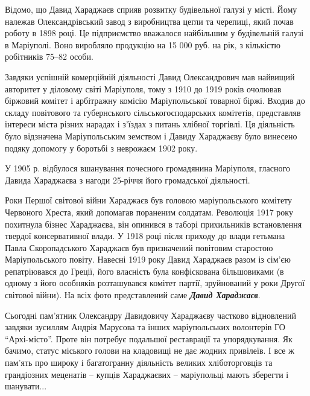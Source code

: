 
Відомо, що Давид Хараджаєв сприяв розвитку будівельної галузі у місті. Йому
належав Олександрівський завод з виробництва цегли та черепиці, який почав
роботу в 1898 році. Це підприємство вважалося найбільшим у будівельній галузі в
Маріуполі. Воно виробляло продукцію на 15 000 руб. на рік, з кількістю
робітників 75–82 особи.

Завдяки успішній комерційній діяльності Давид Олександрович мав найвищий
авторитет у діловому світі Маріуполя, тому з 1910 до 1919 років очолював
біржовий комітет і арбітражну комісію Маріупольської товарної біржі. Входив до
складу повітового та губернського сільськогосподарських комітетів, представляв
інтереси міста різних нарадах і з'їздах з питань хлібної торгівлі. Ця
діяльність було відзначена Маріупольським земством і Давиду Хараджаєву було
винесено подяку допомогу у боротьбі з неврожаєм 1902 року.

У 1905 р. відбулося вшанування почесного громадянина Маріуполя, гласного Давида
Хараджаєва з нагоди 25-річчя його громадської діяльності.

Роки Першої світової війни Хараджаєв був головою маріупольського комітету
Червоного Хреста, який допомагав пораненим солдатам. Революція 1917 року
похитнула бізнес Хараджаєва, він опинився в таборі прихильників встановлення
твердої консервативної влади. У 1918 році після приходу до влади гетьмана Павла
Скоропадського Хараджаєв був призначений повітовим старостою Маріупольського
повіту. Навесні 1919 року Давид Хараджаєв разом із сім'єю репатріювався до
Греції, його власність була конфіскована більшовиками (в одному з його
особняків розташувався комітет партії, зруйнований у роки Другої світової
війни). На всіх фото представлений саме \emph{\textbf{Давид Хараджаєв}}.


Сьогодні пам'ятник Олександру Давидовичу Хараджаєву частково відновлений
завдяки зусиллям Андрія Марусова та інших маріупольських волонтерів ГО
\enquote{Архі-місто}. Проте він потребує подальшої реставрації та упорядкування. Як
бачимо, статус міського голови на кладовищі не дає жодних привілеїв. І все ж
пам'ять про широку і багатогранну діяльність великих хліботорговців та
грандіозних меценатів – купців Хараджаєвих – маріупольці мають зберегти і
шанувати...
